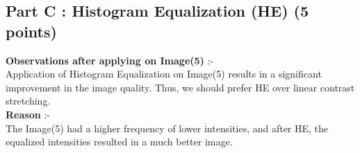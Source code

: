 \documentclass[12pt, a4paper]{article}
\begin{document}
\subsection*{Part C : Histogram Equalization (HE) (5 points)}
\textbf{Observations after applying on Image(5)} :- \\
Application of Histogram Equalization on Image(5) results in a significant improvement in the image quality. Thus, we should prefer HE over linear contrast stretching. \\
\textbf{Reason} :- \\
The Image(5) had a higher frequency of lower intensities, and after HE, the equalized intensities resulted in a much better image. \\
\end{document}
